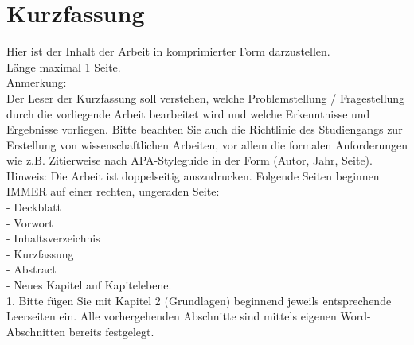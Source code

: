 

\chapter*{Kurzfassung}

Hier ist der Inhalt der Arbeit in komprimierter Form darzustellen.\\
Länge maximal 1 Seite.\\

Anmerkung:\\
Der Leser der Kurzfassung soll verstehen, welche Problemstellung / Fragestellung durch die vorliegende Arbeit bearbeitet wird und welche Erkenntnisse und Ergebnisse vorliegen.
Bitte beachten Sie auch die Richtlinie des Studiengangs zur Erstellung von wissenschaftlichen Arbeiten, vor allem die formalen Anforderungen wie z.B. Zitierweise nach APA-Styleguide in der Form (Autor, Jahr, Seite).\\ 

Hinweis: Die Arbeit ist doppelseitig auszudrucken. Folgende Seiten beginnen IMMER auf einer rechten, ungeraden Seite:\\
-	Deckblatt\\
-	Vorwort\\
-	Inhaltsverzeichnis\\
-	Kurzfassung\\
-	Abstract\\
-	Neues Kapitel auf Kapitelebene.\\ 1. Bitte fügen Sie mit Kapitel 2 (Grundlagen) beginnend jeweils entsprechende Leerseiten ein. Alle vorhergehenden Abschnitte sind mittels eigenen Word-Abschnitten bereits festgelegt.\\
